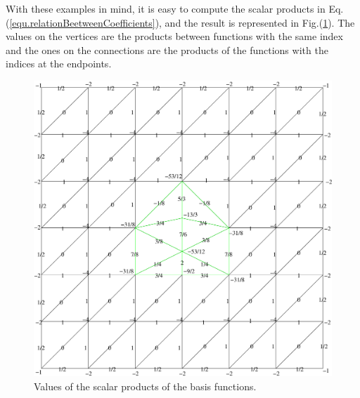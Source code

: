 \documentclass[11pt]{article}
\begin{document}
With these examples in mind, it is easy to compute the scalar products in
Eq.(\ref{equ.relationBeetweenCoefficients}), and the result is
represented in Fig.(\ref{fig.updatedSimpleModel}). The values on the
vertices are the products between functions with the same index and
the ones on the connections are the products of the functions with the
indices at the endpoints. 
\begin{figure}[htb] 
  \begin{center}
    \includegraphics[clip=true, width=1\textwidth]{products} 
  \end{center}
  \caption[]{Values of the scalar products of the basis functions.} 
  \label{fig.updatedSimpleModel} 
\end{figure}
\end{document}
